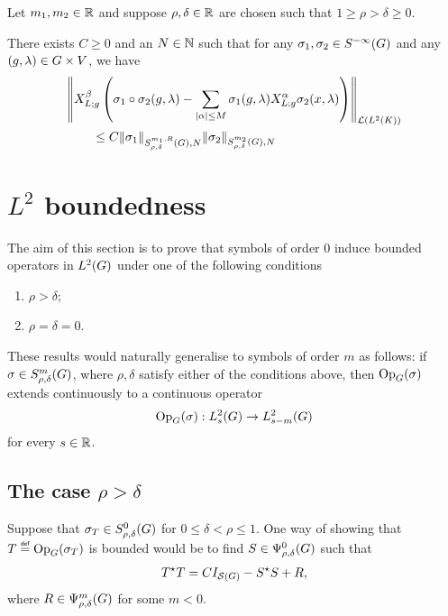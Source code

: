 \begin{lemma}
    Let $m_1, m_2 \in \mathbb{R}$ and suppose $\rho, \delta \in \mathbb{R}$ are chosen such that $1 \geq \rho > \delta \geq 0$.

    There exists $C \geq 0$ and an $N \in \mathbb{N}$ such that
    for any $\sigma_1, \sigma_2 \in {S^{-\infty} (G)}$ and any $(g, \lambda) \in G \times V$,
    we have
    \begin{align*}
        &\norm [\Lin {\Lebesgue 2 \CompactGroup}] {%
            \LeftDifferentialOperator [g]  \beta \left(
                \sigma_1 \circ \sigma_2(g, \lambda)
                - \sum_{\abs \alpha \leq M} \sigma_1(g, \lambda) \LeftDifferentialOperator [g] \alpha \sigma_2(x, \lambda)
            \right)
        }\\
        &\qquad \leq C \SymbolSemiNorm {m_1, R} {\rho, \delta} N {\sigma_1} \SymbolSemiNorm {m_2} {\rho, \delta} N {\sigma_2}
    \end{align*}
\end{lemma}

\section{\texorpdfstring{$L^2$}{L2} boundedness}

The aim of this section is to prove
that symbols of order $0$ induce bounded operators in ${L^{2} (G)}$
under one of the following conditions

\begin{enumerate}
    \item $\rho > \delta$;
    \item $\rho = \delta = 0$.
\end{enumerate}

These results would naturally generalise to symbols of order $m$ as follows:
if $\sigma \in S^{m}_{\rho, \delta}(G)$,
where $\rho, \delta$ satisfy either of the conditions above,
then $\mathrm{Op}_{G}(\sigma)$ extends continuously to a continuous operator
\begin{align*}
    \mathrm{Op}_{G}(\sigma) : L^2_{s}(G) \to L^2_{s - m}(G)
\end{align*}
for every $s \in \mathbb{R}$.

\subsection{The case \texorpdfstring{$\rho > \delta$}{rho bigger than delta}}

Suppose that $\sigma_T \in S^{0}_{\rho, \delta}(G)$ for $0 \leq \delta < \rho \leq 1$.
One way of showing that $T \defeq \Op(\sigma_T)$ is bounded would be to find $S \in \Psi^{0}_{\rho, \delta}(G)$ such that
\begin{align}
    {T}^\star T = C {I_{{\mathcal{S} (G)}}} - {S}^\star S + R,
    \label{eq:L2_boundedness_decomposition}
\end{align}
where $R \in \Psi^{m}_{\rho, \delta}(G)$ for some $m < 0$.

